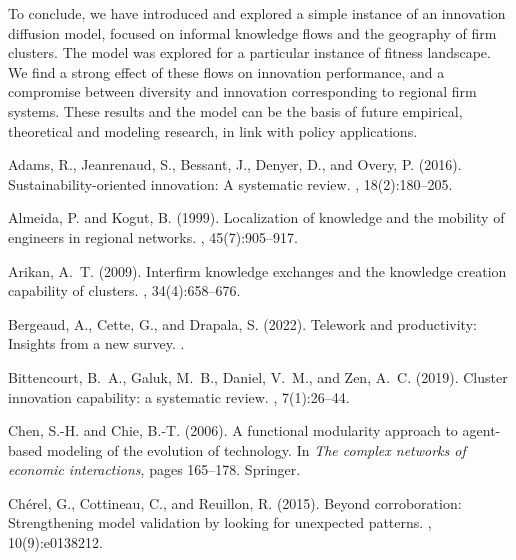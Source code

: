 \documentclass[letterpaper]{article}
\begin{document}
To conclude, we have introduced and explored a simple instance of an innovation diffusion model, focused on informal knowledge flows and the geography of firm clusters. The model was explored for a particular instance of fitness landscape. We find a strong effect of these flows on innovation performance, and a compromise between diversity and innovation corresponding to regional firm systems. These results and the model can be the basis of future empirical, theoretical and modeling research, in link with policy applications.



\footnotesize


\begin{thebibliography}{}

Adams, R., Jeanrenaud, S., Bessant, J., Denyer, D., and Overy, P. (2016).
\newblock Sustainability-oriented innovation: A systematic review.
, 18(2):180--205.

Almeida, P. and Kogut, B. (1999).
\newblock Localization of knowledge and the mobility of engineers in regional
  networks.
, 45(7):905--917.

Arikan, A.~T. (2009).
\newblock Interfirm knowledge exchanges and the knowledge creation capability
  of clusters.
, 34(4):658--676.

Bergeaud, A., Cette, G., and Drapala, S. (2022).
\newblock Telework and productivity: Insights from a new survey.
.

Bittencourt, B.~A., Galuk, M.~B., Daniel, V.~M., and Zen, A.~C. (2019).
\newblock Cluster innovation capability: a systematic review.
, 7(1):26--44.

Chen, S.-H. and Chie, B.-T. (2006).
\newblock A functional modularity approach to agent-based modeling of the
  evolution of technology.
\newblock In {\em The complex networks of economic interactions}, pages
  165--178. Springer.

Ch{\'e}rel, G., Cottineau, C., and Reuillon, R. (2015).
\newblock Beyond corroboration: Strengthening model validation by looking for
  unexpected patterns.
, 10(9):e0138212.


\end{thebibliography}
\end{document}
